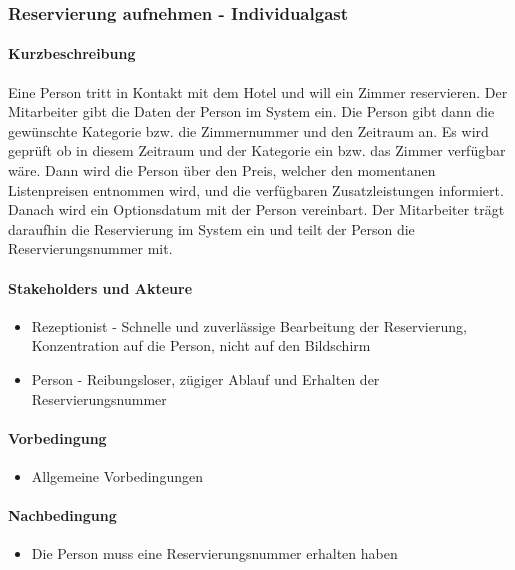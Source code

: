 \subsubsection{Reservierung aufnehmen - Individualgast}

\paragraph{Kurzbeschreibung}
Eine Person tritt in Kontakt mit dem Hotel und will ein \Gls{Zimmer} reservieren. Der Mitarbeiter gibt die Daten der Person im System ein. Die Person gibt dann die gewünschte Kategorie bzw. die Zimmernummer und den Zeitraum an. Es wird geprüft ob in diesem Zeitraum und der Kategorie ein bzw. das \Gls{Zimmer} verfügbar wäre. Dann wird die Person über den Preis, welcher den momentanen Listenpreisen entnommen wird, und die verfügbaren \Gls{Zusatzleistung}en informiert. Danach wird ein \Gls{Optionsdatum} mit der Person vereinbart. Der Mitarbeiter trägt daraufhin die Reservierung im System ein und teilt der Person die \Gls{Reservierungsnummer} mit.

\paragraph{Stakeholders und Akteure}
\begin{itemize}
	\item \Gls{Rezeptionist} - Schnelle und zuverlässige Bearbeitung der
	\Gls{Reservierung}, Konzentration auf die Person, nicht auf den Bildschirm
	\item Person - Reibungsloser, zügiger Ablauf und Erhalten der Reservierungsnummer 
\end{itemize}

\paragraph{Vorbedingung}
\begin{itemize}
	\item Allgemeine Vorbedingungen
\end{itemize}

\paragraph{Nachbedingung}
\begin{itemize}
	\item Die Person muss eine Reservierungsnummer erhalten haben
\end{itemize}

